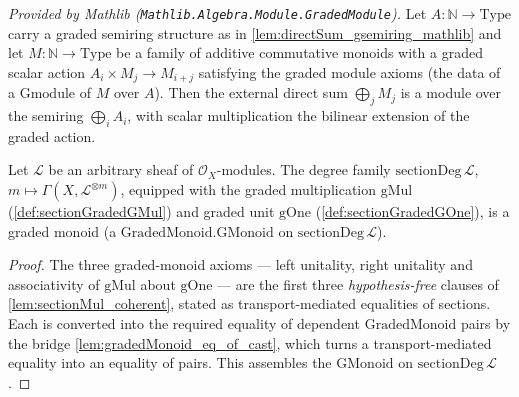 \begin{lemma}
  \label{lem:directSum_gmodule_mathlib}
  \mathlibok
  \textit{Provided by Mathlib (\texttt{Mathlib.Algebra.Module.GradedModule}).}
  Let \(A : \mathbb{N} \to \mathrm{Type}\) carry a graded semiring structure as
  in \cref{lem:directSum_gsemiring_mathlib} and let
  \(M : \mathbb{N} \to \mathrm{Type}\) be a family of additive commutative
  monoids with a graded scalar action \(A_i \times M_j \to M_{i+j}\) satisfying
  the graded module axioms (the data of a \(\mathrm{Gmodule}\) of \(M\) over
  \(A\)). Then the external direct sum \(\bigoplus_j M_j\) is a module over the
  semiring \(\bigoplus_i A_i\), with scalar multiplication the bilinear
  extension of the graded action.
\end{lemma}

\begin{lemma}
  \label{lem:sectionGradedRing_gmonoid}
  Let \(\mathcal{L}\) be an arbitrary sheaf of \(\mathcal{O}_X\)-modules. The degree
  family \(\mathrm{sectionDeg}\,\mathcal{L}\), \(m \mapsto
  \Gamma(X,\mathcal{L}^{\otimes m})\), equipped with the graded multiplication
  \(\mathrm{gMul}\) (\cref{def:sectionGradedGMul}) and graded unit \(\mathrm{gOne}\)
  (\cref{def:sectionGradedGOne}), is a graded monoid (a
  \(\mathrm{GradedMonoid.GMonoid}\) on \(\mathrm{sectionDeg}\,\mathcal{L}\)).
\end{lemma}

\begin{proof}
  \leanok
  The three graded-monoid axioms --- left unitality, right unitality and
  associativity of \(\mathrm{gMul}\) about \(\mathrm{gOne}\) --- are the first three
  \emph{hypothesis-free} clauses of \cref{lem:sectionMul_coherent}, stated as
  transport-mediated equalities of sections. Each is converted into the required
  equality of dependent \(\mathrm{GradedMonoid}\) pairs by the bridge
  \cref{lem:gradedMonoid_eq_of_cast}, which turns a transport-mediated equality into an
  equality of pairs. This assembles the \(\mathrm{GMonoid}\) on
  \(\mathrm{sectionDeg}\,\mathcal{L}\).
\end{proof}

